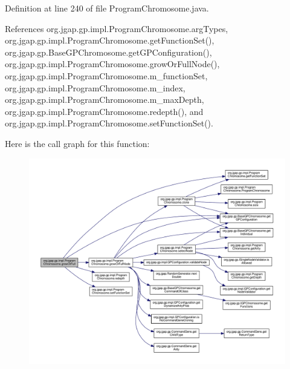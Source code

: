 Definition at line 240 of file Program\-Chromosome.\-java.



References org.\-jgap.\-gp.\-impl.\-Program\-Chromosome.\-arg\-Types, org.\-jgap.\-gp.\-impl.\-Program\-Chromosome.\-get\-Function\-Set(), org.\-jgap.\-gp.\-Base\-G\-P\-Chromosome.\-get\-G\-P\-Configuration(), org.\-jgap.\-gp.\-impl.\-Program\-Chromosome.\-grow\-Or\-Full\-Node(), org.\-jgap.\-gp.\-impl.\-Program\-Chromosome.\-m\-\_\-function\-Set, org.\-jgap.\-gp.\-impl.\-Program\-Chromosome.\-m\-\_\-index, org.\-jgap.\-gp.\-impl.\-Program\-Chromosome.\-m\-\_\-max\-Depth, org.\-jgap.\-gp.\-impl.\-Program\-Chromosome.\-redepth(), and org.\-jgap.\-gp.\-impl.\-Program\-Chromosome.\-set\-Function\-Set().



Here is the call graph for this function\-:
\nopagebreak
\begin{figure}[H]
\begin{center}
\leavevmode
\includegraphics[width=350pt]{classorg_1_1jgap_1_1gp_1_1impl_1_1_program_chromosome_a6b798831e4e59f1dbcd58381e090a9d0_cgraph}
\end{center}
\end{figure}


